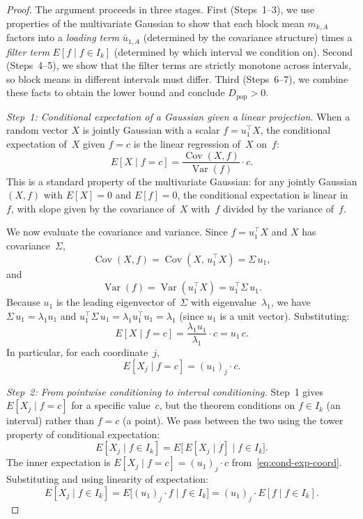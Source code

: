\documentclass[hidelinks]{siamart251216}
\begin{document}
\begin{proof}
  The argument proceeds in three stages.  First
  (Steps~1--3), we use properties of the multivariate Gaussian to show
  that each block mean $m_{k,A}$ factors into a \emph{loading term}
  $\bar{u}_{1,A}$ (determined by the covariance structure) times a
  \emph{filter term} $E[f \mid f \in I_k]$ (determined by which interval
  we condition on).  Second (Steps~4--5), we show that the filter terms
  are strictly monotone across intervals, so block means in different
  intervals must differ.  Third (Steps~6--7), we combine these facts to
  obtain the lower bound and conclude $D_{\mathrm{pop}} > 0$.

  \emph{Step~1: Conditional expectation of a Gaussian given a linear
  projection.}
  When a random vector $X$ is jointly Gaussian with a scalar
  $f = u_1^\top X$, the conditional expectation of~$X$ given $f = c$
  is the linear regression of~$X$ on~$f$:
  \[
    E[X \mid f = c]
    = \frac{\operatorname{Cov}(X, f)}{\operatorname{Var}(f)} \cdot c.
  \]
  This is a standard property of the multivariate Gaussian: for any
  jointly Gaussian $(X, f)$ with $E[X] = 0$ and $E[f] = 0$, the
  conditional expectation is linear in~$f$, with slope given by the
  covariance of~$X$ with~$f$ divided by the variance of~$f$.

  We now evaluate the covariance and variance.  Since $f = u_1^\top X$
  and $X$ has covariance~$\Sigma$,
  \[
    \operatorname{Cov}(X, f)
    = \operatorname{Cov}(X,\, u_1^\top X)
    = \Sigma\, u_1,
  \]
  and
  \[
    \operatorname{Var}(f)
    = \operatorname{Var}(u_1^\top X)
    = u_1^\top \Sigma\, u_1.
  \]
  Because $u_1$ is the leading eigenvector of~$\Sigma$ with
  eigenvalue~$\lambda_1$, we have $\Sigma\, u_1 = \lambda_1 u_1$ and
  $u_1^\top \Sigma\, u_1 = \lambda_1 u_1^\top u_1 = \lambda_1$ (since
  $u_1$ is a unit vector).  Substituting:
  \[
    E[X \mid f = c]
    = \frac{\lambda_1 u_1}{\lambda_1} \cdot c
    = u_1\, c.
  \]
  In particular, for each coordinate~$j$,
  \begin{equation}\label{eq:cond-exp-coord}
    E[X_j \mid f = c] = (u_1)_j \cdot c.
  \end{equation}

  \emph{Step~2: From pointwise conditioning to interval conditioning.}
  Step~1 gives $E[X_j \mid f = c]$ for a specific value~$c$, but the
  theorem conditions on $f \in I_k$ (an interval) rather than
  $f = c$ (a point).  We pass between the two using the tower property
  of conditional expectation:
  \[
    E[X_j \mid f \in I_k]
    = E\bigl[\,E[X_j \mid f]\;\big|\; f \in I_k\bigr].
  \]
  The inner expectation is $E[X_j \mid f = c] = (u_1)_j \cdot c$
  from~\eqref{eq:cond-exp-coord}.  Substituting and using linearity
  of expectation:
  \[
    E[X_j \mid f \in I_k]
    = E\bigl[(u_1)_j \cdot f \;\big|\; f \in I_k\bigr]
    = (u_1)_j \cdot E[f \mid f \in I_k].
  \]


\end{proof}
\end{document}
